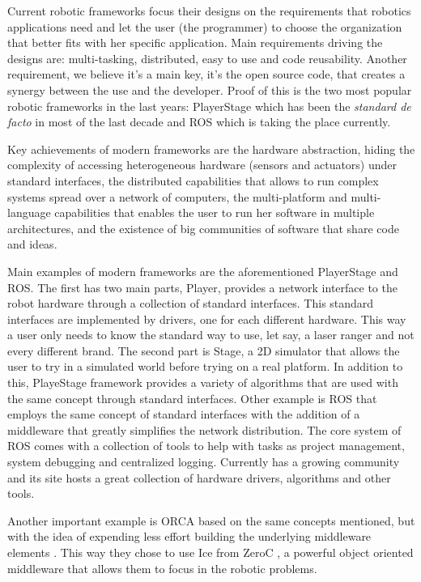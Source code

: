 \documentclass[twocolumn]{svjour3}          %
\begin{document}
Current robotic frameworks focus their designs on the requirements
that robotics applications need and let the user (the programmer) to
choose the organization that better fits with her specific
application. Main requirements driving the designs are: multi-tasking, distributed, easy to
use and code reusability. Another requirement, we believe it's a main
key, it's the open source code, that creates a synergy between the use
and the developer. Proof of this is the two most popular robotic
frameworks in the last years: PlayerStage
\cite{Gerkey03,collet05,vaughan2007} which has been the \textit{standard de
facto} in most of the last decade and ROS \cite{quigley09} which is
taking the place currently.

Key achievements of modern frameworks are the hardware abstraction, hiding the complexity of accessing heterogeneous hardware (sensors and
actuators) under standard interfaces, the distributed capabilities
that allows to run complex systems spread over a network of computers,
the multi-platform and multi-language capabilities that enables the
user to run her software in multiple architectures, and the existence
of big communities of software that share code and ideas.

Main examples of modern frameworks are the aforementioned PlayerStage
and ROS. The first has two main parts, Player, provides a network
interface to the robot hardware through a collection of standard
interfaces. This standard interfaces are implemented by drivers, one
for each different hardware. This way a user only needs to know the
standard way to use, let say, a laser ranger and not every different
brand. The second part is Stage, a 2D simulator that allows the user
to try in a simulated world before trying on a real platform. In
addition to this, PlayeStage framework provides a variety of
algorithms that are used with the same concept through standard
interfaces. Other example is ROS that employs the same concept of
standard interfaces with the addition of a middleware that greatly
simplifies the network distribution. The core system of ROS comes with
a collection of tools to help with tasks as project management, system
debugging and centralized logging. Currently has a growing community
and its site hosts a great collection of hardware drivers, algorithms
and other tools.

Another important example is ORCA \cite{brooks05,brooks07} based on the
same concepts mentioned, but with the idea of expending less effort
building the underlying middleware elements . This way they chose to
use Ice from ZeroC \cite{henning04}, a powerful object oriented middleware
that allows them to focus in the robotic problems.
\end{document}
